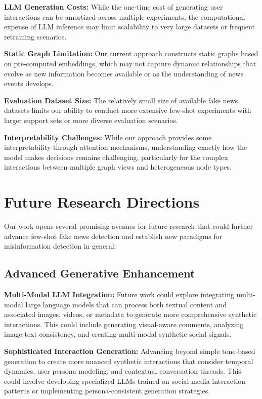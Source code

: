 \textbf{LLM Generation Costs:} While the one-time cost of generating user interactions can be amortized across multiple experiments, the computational expense of LLM inference may limit scalability to very large datasets or frequent retraining scenarios.

\textbf{Static Graph Limitation:} Our current approach constructs static graphs based on pre-computed embeddings, which may not capture dynamic relationships that evolve as new information becomes available or as the understanding of news events develops.

\textbf{Evaluation Dataset Size:} The relatively small size of available fake news datasets limits our ability to conduct more extensive few-shot experiments with larger support sets or more diverse evaluation scenarios.

\textbf{Interpretability Challenges:} While our approach provides some interpretability through attention mechanisms, understanding exactly how the model makes decisions remains challenging, particularly for the complex interactions between multiple graph views and heterogeneous node types.

\section{Future Research Directions}

Our work opens several promising avenues for future research that could further advance few-shot fake news detection and establish new paradigms for misinformation detection in general:

\subsection{Advanced Generative Enhancement}

\textbf{Multi-Modal LLM Integration:} Future work could explore integrating multi-modal large language models that can process both textual content and associated images, videos, or metadata to generate more comprehensive synthetic interactions. This could include generating visual-aware comments, analyzing image-text consistency, and creating multi-modal synthetic social signals.


\textbf{Sophisticated Interaction Generation:} Advancing beyond simple tone-based generation to create more nuanced synthetic interactions that consider temporal dynamics, user persona modeling, and contextual conversation threads. This could involve developing specialized LLMs trained on social media interaction patterns or implementing persona-consistent generation strategies.


